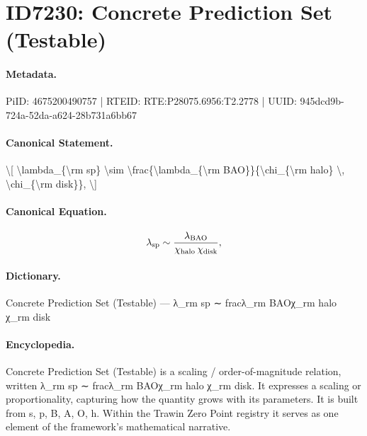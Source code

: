 \section*{ID7230: Concrete Prediction Set (Testable)}
\paragraph{Metadata.}
PiID: 4675200490757 | RTEID: RTE:P28075.6956:T2.2778 | UUID: 945dcd9b-724a-52da-a624-28b731a6bb67

\paragraph{Canonical Statement.}
\textbackslash{}[ \textbackslash{}lambda\_\{\textbackslash{}rm sp\} \textbackslash{}sim \textbackslash{}frac\{\textbackslash{}lambda\_\{\textbackslash{}rm BAO\}\}\{\textbackslash{}chi\_\{\textbackslash{}rm halo\} \textbackslash{}, \textbackslash{}chi\_\{\textbackslash{}rm disk\}\}, \textbackslash{}]

\paragraph{Canonical Equation.}
\[
\lambda_{\rm sp} \sim \frac{\lambda_{\rm BAO}}{\chi_{\rm halo} \, \chi_{\rm disk}},
\]

\paragraph{Dictionary.}
Concrete Prediction Set (Testable) — λ\_rm sp ∼ fracλ\_rm BAOχ\_rm halo χ\_rm disk

\paragraph{Encyclopedia.}
Concrete Prediction Set (Testable) is a scaling / order-of-magnitude relation, written λ\_rm sp ∼ fracλ\_rm BAOχ\_rm halo χ\_rm disk. It expresses a scaling or proportionality, capturing how the quantity grows with its parameters. It is built from s, p, B, A, O, h. Within the Trawin Zero Point registry it serves as one element of the framework's mathematical narrative.
